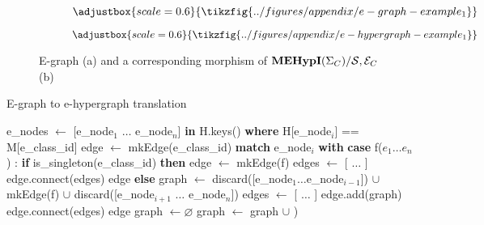 \begin{figure}
    \begin{subfigure}[C]{0.35\linewidth}
\[
\adjustbox{scale=0.6}{
\tikzfig{../figures/appendix/e-graph-example_1}
}
\]
\caption{\;}
\end{subfigure}
\hfill
\begin{subfigure}[C]{0.6\linewidth}
    \[
    \adjustbox{scale=0.6}{
    \tikzfig{../figures/appendix/e-hypergraph-example_1}
    }
    \]
\caption{\;}
\end{subfigure}
\hfill
\caption{E-graph (a) and a corresponding morphism of $\mathbf{MEHypI}(\Sigma_{C}) / \mathcal{S}, \mathcal{E}_{C}$ (b)}
\label{fig:e-graph-to-cospan}
\end{figure}

\begin{algorithm*}
    \caption{E-graph to e-hypergraph translation}
    \label{alg:translation}
    \begin{algorithmic}[1]
    \State e\_nodes $\gets$ [e\_node$_{1}$ $\ldots$ e\_node$_{n}$] \textbf{in} H.keys() \textbf{where} H[e\_node$_{i}$] == M[e\_class\_id]
    \State edge $\gets$ mkEdge(e\_class\_id)
    \State \textbf{match} e\_node$_{i}$ \textbf{with}
    \State \qquad \textbf{case} f($e_1 \ldots e_{n}$) :
    \State \qquad \qquad \textbf{if} is\_singleton(e\_class\_id) \textbf{then}
        \State \qquad\qquad \hspace{2em} edge $\gets$ mkEdge(f)
        \State \qquad \qquad \hspace{2em} edges $\gets$ [ $\ldots$ ]
        \State \qquad \qquad \hspace{2em} edge.connect(edges)
        \State \qquad \qquad \hspace{2em} \Return edge
    \State \qquad \qquad \textbf{else}
    \State \qquad \qquad \hspace{2em} graph $\gets$ discard([e\_node$_1$$\ldots$e\_node$_{i-1}$]) $\cup$ mkEdge(f) $\cup$ discard([e\_node$_{i+1}$ $\ldots$ e\_node$_{n}$])
        \State \qquad \qquad \hspace{2em} edges $\gets$ [ $\ldots$ ]
        \State \qquad \qquad \hspace{2em} edge.add(graph)
        \State \qquad \qquad \hspace{2em} edge.connect(edges)
    \EndFor
    \State \Return edge
    \EndFunction
    \State
    \State graph $\gets \varnothing$ 
    \State graph $\gets$ graph $\cup$ )


\end{algorithmic}
\end{algorithm*}
